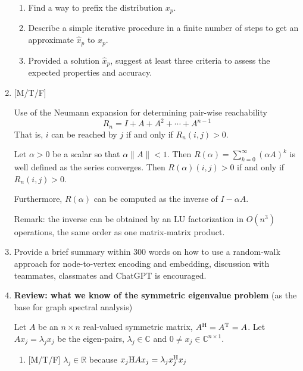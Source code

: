 \begin{enumerate}
\begin{enumerate}
     \item Find a way to prefix the distribution $x_{p}$.

     \item Describe a simple iterative procedure in a finite number of
       steps to get an approximate $\widehat{x}_{p}$ to $x_{p}$.

     \item Provided a solution $\widehat{x}_{p}$, suggest at least three
       criteria to assess the expected properties and accuracy.

     \end{enumerate}

   \item { [M/T/F] }

     Use of the Neumann expansion for determining pair-wise
     reachability
     \begin{equation}
       \label{eq:reachbility-matrix} 
        R_{n} = I + A + A^{2} + \cdots + A^{n-1} 
     \end{equation}
     That is, $i$ can be reached by $j$ if and only if
     $R_{n}(i,j) > 0$.
     
     Let $\alpha>0$ be a scalar so that $\alpha \|A\|<1$.  Then
     $R(\alpha) = \sum_{k=0}^{\infty} (\alpha A)^{k}$ is well defined
     as the series converges.  Then $ R(\alpha)(i,j) > 0$ if and only
     if $R_{n}(i,j) > 0$.

     Furthermore, $R(\alpha)$ can be computed as the inverse of
     $I-\alpha A$.

     {\small Remark: the inverse can be obtained by an LU
       factorization in $O(n^3)$ operations, the same order as one
       matrix-matrix product.}

   \item Provide a brief summary within $300$ words on how to use a
     random-walk approach for node-to-vertex encoding and embedding,
     discussion with teammates, classmates and ChatGPT is encouraged.

     \newpage
     
 \item {\bf Review: what we know of the symmetric eigenvalue problem}
   (as the base for graph spectral analysis)
   
 Let $A$ be an $n\times n$ real-valued symmetric matrix,
 $A^{\rm H} = A^{\rm T} = A$.  Let $A x_{j} = \lambda_j x_{j}$ be the
 eigen-pairs, $\lambda_{j} \in \mathbb{C}$ and
 $ 0 \neq x_{j} \in \mathbb{C}^{n\times 1}$.
   
   \begin{enumerate}
   \item { [M/T/F] }
       $\lambda_{j} \in \mathbb{R}$ because
       $x_{j}{\rm H} A x_{j} = \lambda_j x_{j}^{\rm H} x_{j}$


\end{enumerate}
\end{enumerate}
